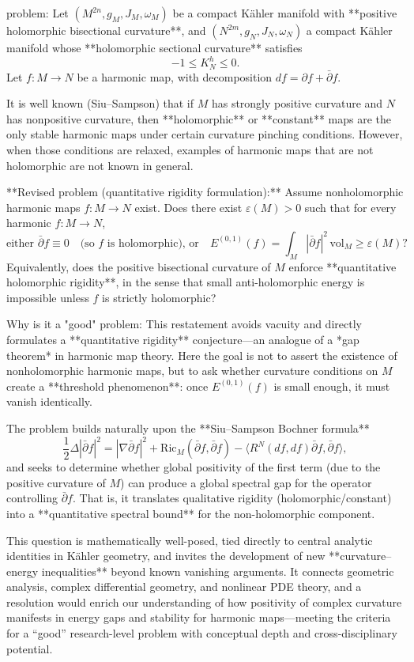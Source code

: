 problem:  
Let \( (M^{2n}, g_M, J_M, \omega_M) \) be a compact Kähler manifold with **positive holomorphic bisectional curvature**, and \( (N^{2m}, g_N, J_N, \omega_N) \) a compact Kähler manifold whose **holomorphic sectional curvature** satisfies 
\[
-1 \le K^h_N \le 0.
\]
Let \( f : M \to N \) be a harmonic map, with decomposition \(df = \partial f + \bar{\partial} f\).  

It is well known (Siu–Sampson) that if \(M\) has strongly positive curvature and \(N\) has nonpositive curvature, then **holomorphic** or **constant** maps are the only stable harmonic maps under certain curvature pinching conditions. However, when those conditions are relaxed, examples of harmonic maps that are not holomorphic are not known in general.

**Revised problem (quantitative rigidity formulation):**  
Assume nonholomorphic harmonic maps \(f : M \to N\) exist. Does there exist \(\varepsilon(M) > 0\) such that for every harmonic \(f: M \to N\),
\[
\text{either } \bar{\partial} f \equiv 0 \quad \text{(so \(f\) is holomorphic), or} \quad E^{(0,1)}(f) = \int_M |\bar{\partial} f|^2 \, \mathrm{vol}_M \ge \varepsilon(M)?
\]
Equivalently, does the positive bisectional curvature of \(M\) enforce **quantitative holomorphic rigidity**, in the sense that small anti-holomorphic energy is impossible unless \(f\) is strictly holomorphic?

Why is it a "good" problem:  
This restatement avoids vacuity and directly formulates a **quantitative rigidity** conjecture—an analogue of a *gap theorem* in harmonic map theory. Here the goal is not to assert the existence of nonholomorphic harmonic maps, but to ask whether curvature conditions on \(M\) create a **threshold phenomenon**: once \(E^{(0,1)}(f)\) is small enough, it must vanish identically.  

The problem builds naturally upon the **Siu–Sampson Bochner formula**
\[
\frac12\Delta |\bar{\partial}f|^2 = |\nabla \bar{\partial} f|^2 + 
\mathrm{Ric}_M(\bar{\partial}f,\bar{\partial}f)
- \langle R^N(df,df)\bar{\partial}f,\bar{\partial}f\rangle,
\]
and seeks to determine whether global positivity of the first term (due to the positive curvature of \(M\)) can produce a global spectral gap for the operator controlling \(\bar{\partial} f\). That is, it translates qualitative rigidity (holomorphic/constant) into a **quantitative spectral bound** for the non-holomorphic component.  

This question is mathematically well-posed, tied directly to central analytic identities in Kähler geometry, and invites the development of new **curvature–energy inequalities** beyond known vanishing arguments. It connects geometric analysis, complex differential geometry, and nonlinear PDE theory, and a resolution would enrich our understanding of how positivity of complex curvature manifests in energy gaps and stability for harmonic maps—meeting the criteria for a “good” research-level problem with conceptual depth and cross-disciplinary potential.